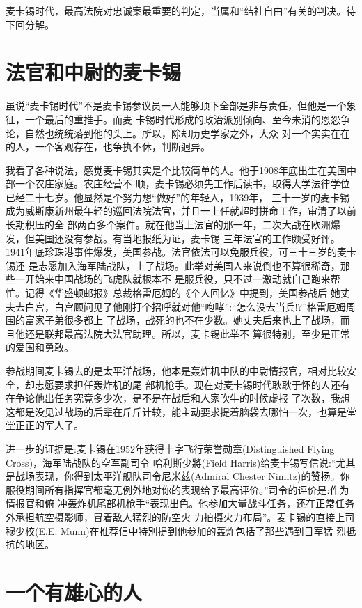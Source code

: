 \documentclass[10pt]{article}
\begin{document}
{麦卡锡时代，最高法院对忠诚案最重要的判定，当属和``结社自由''有关的判决。待下回分解。

\pagebreak
\section{法官和中尉的麦卡锡}

虽说``麦卡锡时代''不是麦卡锡参议员一人能够顶下全部是非与责任，但他是一个象征，一个最后的重推手。而麦
卡锡时代形成的政治派别倾向、至今未消的恩怨争论，自然也统统落到他的头上。所以，除却历史学家之外，大众
对一个实实在在的人，一个客观存在，也争执不休，判断迥异。

我看了各种说法，感觉麦卡锡其实是个比较简单的人。他于1908年底出生在美国中部一个农庄家庭。农庄经营不
顺，麦卡锡必须先工作后读书，取得大学法律学位已经二十七岁。他显然是个努力想``做好''的年轻人，1939年，
三十一岁的麦卡锡成为威斯康新州最年轻的巡回法院法官，并且一上任就超时拼命工作，审清了以前长期积压的全
部两百多个案件。就在他当上法官的那一年，二次大战在欧洲爆发，但美国还没有参战。有当地报纸为证，麦卡锡
三年法官的工作颇受好评。1941年底珍珠港事件爆发，美国参战。法官依法可以免服兵役，可三十三岁的麦卡锡还
是志愿加入海军陆战队，上了战场。此举对美国人来说倒也不算很稀奇，那些一开始来中国战场的飞虎队就根本不
是服兵役，只不过一激动就自己跑来帮忙。记得《华盛顿邮报》总裁格雷厄姆的《个人回忆》中提到，美国参战后
她丈夫去白宫，白宫顾问见了他刚打个招呼就对他``咆哮'':``怎么没去当兵!?''格雷厄姆周围的富家子弟很多都上
了战场，战死的也不在少数。她丈夫后来也上了战场，而且他还是联邦最高法院大法官助理。所以，麦卡锡此举不
算很特别，至少是正常的爱国和勇敢。

参战期间麦卡锡去的是太平洋战场，他本是轰炸机中队的中尉情报官，相对比较安全，却志愿要求担任轰炸机的尾
部机枪手。现在对麦卡锡时代耿耿于怀的人还有在争论他出任务究竟多少次，是不是在战后和人家吹牛的时候虚报
了次数，我想这都是没见过战场的后辈在斤斤计较，能主动要求提着脑袋去哪怕一次，也算是堂堂正正的军人了。

进一步的证据是:麦卡锡在1952年获得十字飞行荣誉勋章(Distinguished Flying Cross)，海军陆战队的空军副司令
哈利斯少將(Field Harris)给麦卡锡写信说:``尤其是战场表现，你得到太平洋舰队司令尼米兹(Admiral Chester
Nimitz)的赞扬。你服役期间所有指挥官都毫无例外地对你的表现给予最高评价。''司令的评价是:作为情报官和俯
冲轰炸机尾部机枪手``表现出色。他参加大量战斗任务，还在正常任务外承担航空摄影师，冒着敌人猛烈的防空火
力拍摄火力布局''。麦卡锡的直接上司穆少校(E.E. Munn)在推荐信中特別提到他参加的轰炸包括了那些遇到日军猛
烈抵抗的地区。

\pagebreak
\section{一个有雄心的人}

}
\end{document}
